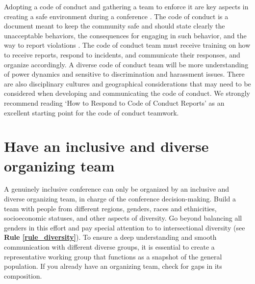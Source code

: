 \documentclass[10pt,letterpaper]{article}
\begin{document}
Adopting a code of conduct and gathering a team to enforce it are key aspects in creating a safe environment during a conference \cite{favaroYourScienceConference2016}.
The code of conduct is a document meant to keep the community safe and should state clearly the unacceptable behaviors, the consequences for engaging in such behavior, and the way to report violations \cite{auroraHowRespondCode2019}. 
The code of conduct team must receive training on how to receive reports, respond to incidents, and communicate their responses, and organize accordingly. 
A diverse code of conduct team will be more understanding of power dynamics and sensitive to discrimination and harassment issues. 
There are also disciplinary cultures and geographical considerations that may need to be considered when developing and communicating the code of conduct. 
We strongly recommend reading `How to Respond to Code of Conduct Reports' \cite{auroraHowRespondCode2019} as an excellent starting point for the code of conduct teamwork.


\section{Have an inclusive and diverse organizing team}
\label{rule_organizing_team}

A genuinely inclusive conference can only be organized by an inclusive and diverse organizing team, in charge of the conference decision-making.
Build a team with people from different regions, genders, races and ethnicities, socioeconomic statuses, and other aspects of diversity. 
Go beyond balancing all genders in this effort and pay special attention to to intersectional diversity (see \textbf{Rule \ref{rule_diversity}}). 
To ensure a deep understanding and smooth communication with different diverse groups, it is essential to create a representative working group that functions as a snapshot of the general population.
If you already have an organizing team, check for gaps in its composition. 
\end{document}

